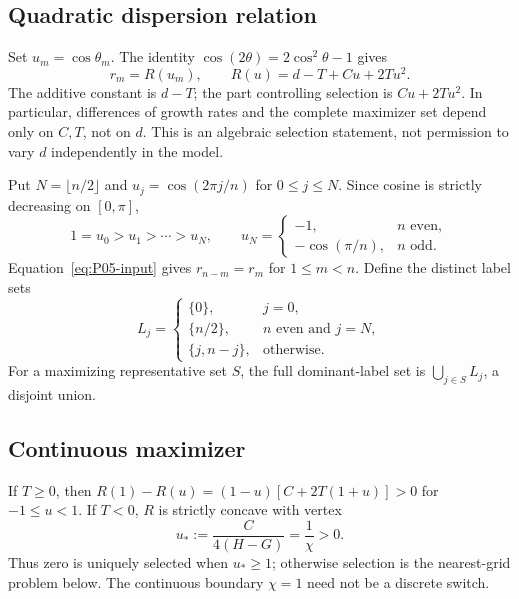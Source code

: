 \documentclass[11pt]{article}
\theoremstyle{definition}
\theoremstyle{remark}
\begin{document}
\subsection{Quadratic dispersion relation}
\label{slot:P05-1}
Set $u_m=\cos\theta_m$. The identity $\cos(2\theta)=2\cos^2\theta-1$
gives
\begin{equation}
 r_m=R(u_m),\qquad
 \boxed{R(u)=d-T+Cu+2Tu^2.}
 \label{eq:P05-quadratic}
\end{equation}
The additive constant is $d-T$; the part controlling selection is
$Cu+2Tu^2$. In particular, differences of growth rates and the complete
maximizer set depend only on $C,T$, not on $d$. This is an algebraic
selection statement, not permission to vary $d$ independently in the model.

Put $N=\lfloor n/2\rfloor$ and $u_j=\cos(2\pi j/n)$ for $0\le j\le N$.
Since cosine is strictly decreasing on $[0,\pi]$,
\begin{equation}
 1=u_0>u_1>\cdots>u_N,\qquad
 u_N=\begin{cases}-1,&n\text{ even},\\-\cos(\pi/n),&n\text{ odd}.
 \end{cases}
 \label{eq:P05-grid}
\end{equation}
Equation~\eqref{eq:P05-input} gives $r_{n-m}=r_m$ for $1\le m<n$.
Define the distinct label sets
\begin{equation}
 L_j=\begin{cases}
 \{0\},&j=0,\\
 \{n/2\},&n\text{ even and }j=N,\\
 \{j,n-j\},&\text{otherwise}.
 \end{cases}
 \label{eq:P05-labels}
\end{equation}
For a maximizing representative set $S$, the full dominant-label set is
$\bigcup_{j\in S}L_j$, a disjoint union.


\subsection{Continuous maximizer}
If $T\ge0$, then
$R(1)-R(u)=(1-u)[C+2T(1+u)]>0$ for $-1\le u<1$.
If $T<0$, $R$ is strictly concave with vertex
\begin{equation}
 u_*:=\frac{C}{4(H-G)}=\frac1\chi>0.
 \label{eq:P05-vertex}
\end{equation}
Thus zero is uniquely selected when $u_*\ge1$; otherwise selection
is the nearest-grid problem below. The continuous boundary $\chi=1$
need not be a discrete switch.
\end{document}
